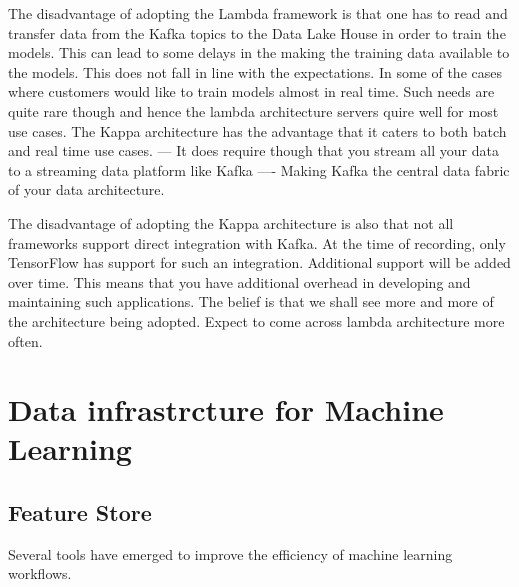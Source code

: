 \documentclass[a4paper, 11pt]{article}
\begin{document}
    The disadvantage of adopting the Lambda framework is that one has to read and transfer data from the Kafka topics to the Data Lake House in order to train the models.
    This can lead to some delays in the making the training data available to the models.
    This does not fall in line with the expectations.
    In some of the cases where customers would like to train models almost in real time.
    Such needs are quite rare though and hence the lambda architecture servers quire well for most use cases.
    The Kappa architecture has the advantage that it caters to both batch and real time use cases.
    --- It does require though that you stream all your data to a streaming data platform like Kafka
    ---- Making Kafka the central data fabric of your data architecture.

    The disadvantage of adopting the Kappa architecture is also that not all frameworks support direct integration with Kafka.
    At the time of recording, only TensorFlow has support for such an integration.
    Additional support will be added over time.
    This means that you have additional overhead in developing and maintaining such applications.
    The belief is that we shall see more and more of the architecture being adopted.
    Expect to come across lambda architecture more often.



    \section{Data infrastrcture for Machine Learning}

    \subsection{Feature Store}
    Several tools have emerged to improve the efficiency of machine learning workflows.
\end{document}
